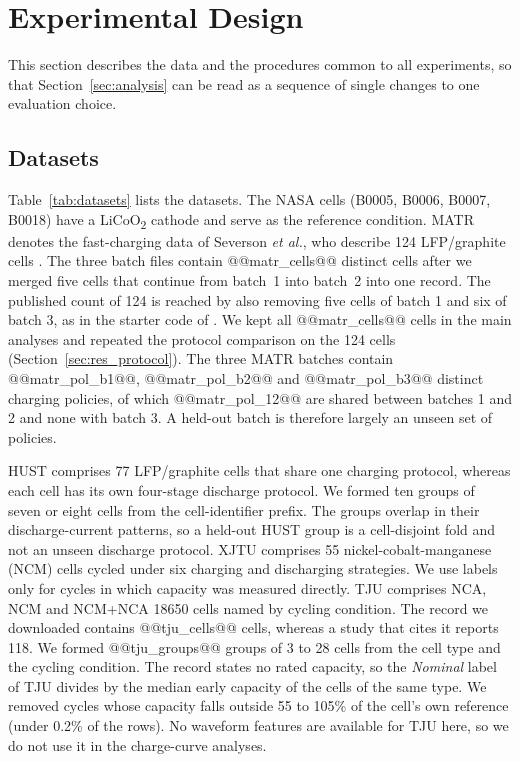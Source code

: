 \documentclass{ieeeaccess}
\newcommand{\fitcol}[1]{\footnotesize\resizebox{\ifdim\width>\columnwidth\columnwidth\else\width\fi}{!}{}}
\begin{document}
\section{Experimental Design}
\label{sec:design}
This section describes the data and the procedures common to all experiments, so that Section~\ref{sec:analysis} can be read as a sequence of single changes to one evaluation choice.


\subsection{Datasets}
Table~\ref{tab:datasets} lists the datasets. The NASA cells (B0005, B0006, B0007, B0018) \cite{saha2007} have a LiCoO\textsubscript{2} cathode \cite{le2026} and serve as the reference condition. MATR denotes the fast-charging data of Severson \textit{et al.}, who describe 124 LFP/graphite cells \cite{severson2019}. The three batch files contain @@matr_cells@@ distinct cells after we merged five cells that continue from batch~1 into batch~2 into one record. The published count of 124 is reached by also removing five cells of batch 1 and six of batch 3, as in the starter code of \cite{erdogan2026}. We kept all @@matr_cells@@ cells in the main analyses and repeated the protocol comparison on the 124 cells (Section~\ref{sec:res_protocol}). The three MATR batches contain @@matr_pol_b1@@, @@matr_pol_b2@@ and @@matr_pol_b3@@ distinct charging policies, of which @@matr_pol_12@@ are shared between batches 1 and 2 and none with batch 3. A held-out batch is therefore largely an unseen set of policies.

HUST \cite{ma2022} comprises 77 LFP/graphite cells that share one charging protocol, whereas each cell has its own four-stage discharge protocol. We formed ten groups of seven or eight cells from the cell-identifier prefix. The groups overlap in their discharge-current patterns, so a held-out HUST group is a cell-disjoint fold and not an unseen discharge protocol. XJTU \cite{wang2024} comprises 55 nickel-cobalt-manganese (NCM) cells cycled under six charging and discharging strategies. We use labels only for cycles in which capacity was measured directly. TJU \cite{zhu2022} comprises NCA, NCM and NCM+NCA 18650 cells named by cycling condition. The record we downloaded contains @@tju_cells@@ cells, whereas a study that cites it \cite{aud28} reports 118. We formed @@tju_groups@@ groups of 3 to 28 cells from the cell type and the cycling condition. The record states no rated capacity, so the \textit{Nominal} label of TJU divides by the median early capacity of the cells of the same type. We removed cycles whose capacity falls outside 55 to 105\% of the cell's own reference (under 0.2\% of the rows). No waveform features are available for TJU here, so we do not use it in the charge-curve analyses.
\begin{table}[!tb]
\centering
\caption{Datasets and held-out groups for protocol P3.}
\label{tab:datasets}
\scriptsize
\fitcol{tables/datasets.tex}
\end{table}
\end{document}

